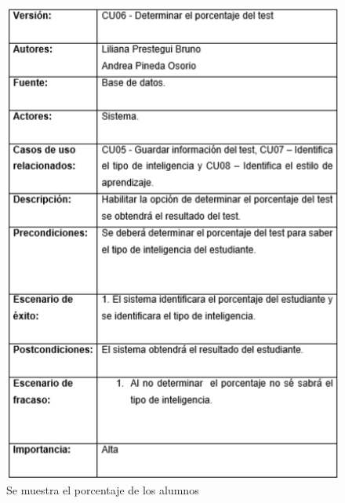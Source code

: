 \documentclass[letterpaper,oneside,openany,11pt]{book}
\begin{document}
\begin{figure}[H]
	\centering
	\includegraphics[width=1.0\textwidth]{./Imagenes/18}
	\caption{Se muestra el porcentaje de los alumnos}
\end{figure}
\end{document}
